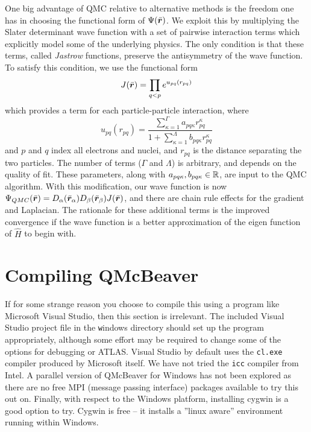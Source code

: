 \documentclass[11pt]{article}
\begin{document}
One big advantage of QMC relative to alternative methods is the
freedom one has in choosing the functional form of $\Psi(\bar{\bm r})$. We
exploit this by multiplying the Slater determinant wave function with
a set of pairwise interaction terms which explicitly model some of the
underlying physics. The only condition is that these terms, called
\emph{Jastrow} functions, preserve the antisymmetry of the wave
function. To satisfy this condition, we use the functional form
\begin{equation} \label{eq:jastrow}
J(\bar{\bm r}) =  \prod_{q<p} e^{ u_{pq} (r_{pq})}
\end{equation}
which provides a term for each particle-particle interaction, where 
\begin{equation} \label{eq:jastrowU}
u_{pq} (r_{pq}) =
\frac{ \sum_{\kappa=1}^{\Gamma} a_{pq\kappa} r_{pq}^\kappa}
{1+\sum_{\kappa=1}^\Lambda b_{pq\kappa} r_{pq}^\kappa}
\end{equation}
and $p$ and $q$ index all electrons and nuclei, and $r_{pq}$ is the
distance separating the two particles. The number of terms ($\Gamma$
and $\Lambda$) is arbitrary, and depends on the quality of fit.  These
parameters, along with $a_{pq\kappa}, b_{pq\kappa} \in \mbox{$\mathbb R$}$, are input
to the QMC algorithm. With this modification, our wave function is now
$\Psi_{QMC}(\bar{\bm r}) = D_\alpha(\bar{\bm r}_\alpha) D_\beta(\bar{\bm r}_\beta)
J(\bar{\bm r})$, and there are chain rule effects for the gradient and
Laplacian. The rationale for these additional terms is the improved
convergence if the wave function is a better approximation of the
eigen function of $\hat{H}$ to begin with.

\section{Compiling QMcBeaver}
If for some strange reason you choose to compile this using a program like Microsoft Visual Studio, then this section is irrelevant. The included Visual Studio project file in the {\texttt windows} directory should set up the program appropriately, although some effort may be required to change some of the options for debugging or ATLAS. Visual Studio by default uses the \texttt{cl.exe} compiler produced by Microsoft itself. We have not tried the \texttt{icc} compiler from Intel. A parallel version of QMcBeaver for Windows has not been explored as there are no free MPI (message passing interface) packages available to try this out on. Finally, with respect to the Windows platform, installing cygwin is a good option to try. Cygwin is free -- it installs a ''linux aware'' environment running within Windows.
\end{document}

